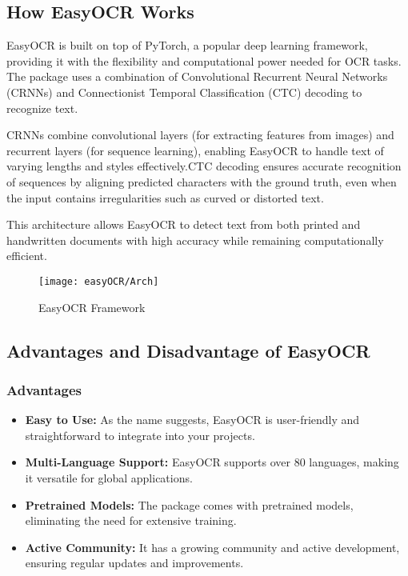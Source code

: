 \subsection{How EasyOCR Works}

EasyOCR is built on top of PyTorch, a popular deep learning framework, providing it with the flexibility and computational power needed for OCR tasks. The package uses a combination of Convolutional Recurrent Neural Networks (CRNNs) and Connectionist Temporal Classification (CTC) decoding to recognize text.

CRNNs combine convolutional layers (for extracting features from images) and recurrent layers (for sequence learning), enabling EasyOCR to handle text of varying lengths and styles effectively.CTC decoding ensures accurate recognition of sequences by aligning predicted characters with the ground truth, even when the input contains irregularities such as curved or distorted text.

This architecture allows EasyOCR to detect text from both printed and handwritten documents with high accuracy while remaining computationally efficient.

\begin{figure}[h]
	\centering
	\texttt{[image: easyOCR/Arch]}
	\caption{EasyOCR Framework}\label{EasyOCR Framework}
\end{figure}

\subsection{Advantages and Disadvantage of EasyOCR}

\subsubsection{Advantages}
\begin{itemize}
	\item \textbf{Easy to Use:} As the name suggests, EasyOCR is user-friendly and straightforward to integrate into your projects.
	\item \textbf{Multi-Language Support:} EasyOCR supports over 80 languages, making it versatile for global applications.
	\item \textbf{Pretrained Models:} The package comes with pretrained models, eliminating the need for extensive training.
	\item \textbf{Active Community:} It has a growing community and active development, ensuring regular updates and improvements.\cite{Glintecoeasyocr:2023}
\end{itemize}

